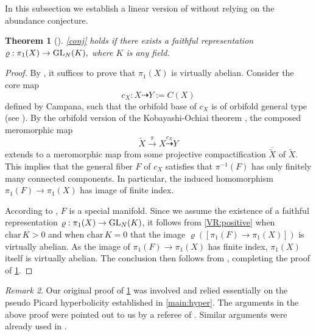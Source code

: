 \documentclass[english]{amsproc}
\theoremstyle{plain}
\newtheorem{thm}{Theorem}[section]
\newtheorem{lem}[thm]{Lemma}
\theoremstyle{definition}
\theoremstyle{remark}
\newtheorem{rem}[thm]{Remark}
\theoremstyle{plain}
\numberwithin{equation}{thm} %
\newcommand{\GL}{{\rm GL}}
\begin{document}
		In this subsection we establish a linear version of  without relying on the abundance conjecture.   
		\begin{thm}[{\cite[Corollary G]{DY23b}}]\label{thm:univ}
		\cref{conj} holds if  there exists a faithful  representation $\varrho:\pi_1(X)\to \GL_{N}(K),$ where $K$ is any field.
		\end{thm} 
		\begin{proof} 
By \cite{CH13}, it suffices to prove that $\pi_1(X)$ is virtually abelian. 			Consider the core map $$c_X: X \dashrightarrow Y := C(X)$$  defined by Campana, such that  the orbifold base of $c_X$ is of orbifold general type (see \cite{Cam04}). By the orbifold version of the Kobayashi-Ochiai theorem \cite[Theorem 8.2]{Cam04}, the composed meromorphic map
			\[
			\widetilde{X} \xrightarrow{\pi} X \overset{c_X}{\dashrightarrow} Y
			\]
			extends to a meromorphic map from some projective compactification $\overline{\widetilde{X}}$ of $\widetilde{X}$. This implies that the general fiber $F$ of $c_X$ satisfies that $\pi^{-1}(F)$ has only finitely many connected components. In particular, the induced homomorphism $\pi_1(F) \rightarrow \pi_1(X)$ has image of finite index.
			
			According to \cite{Cam04}, $F$ is a special manifold. Since we assume the existence of a faithful representation $\varrho: \pi_1(X) \to \GL_N(K)$,   it follows from \cref{VR:positive} when $\mathrm{char}\, K>0$ and  \cite[Theorem 7.8]{Cam04} when $\mathrm{char}\, K=0$ that the image $\varrho([\pi_1(F)\to \pi_1(X)])$ is virtually abelian. As the image of $\pi_1(F) \to \pi_1(X)$ has finite index, $\pi_1(X)$ itself is virtually abelian. The conclusion then follows from \cite[Theorem 1.5]{CH13}, completing the proof of \cref{thm:univ}.
		\end{proof} 
\begin{rem}
	 Our original proof of \cref{thm:univ} was involved and relied essentially on the
	 pseudo Picard hyperbolicity established in \cref{main:hyper}.
	 The arguments in the above proof were pointed out to us by a referee
	 of \cite{DY23b}.
	 Similar arguments were already used in \cite{CH13}.
\end{rem}

		
		
\end{document}
